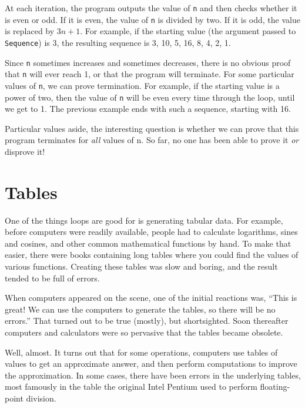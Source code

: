 At each iteration, the program outputs the value of {\tt n} and then
checks whether it is even or odd.  If it is even, the value of
{\tt n} is divided by two.  If it is odd, the value is replaced
by $3n+1$.  For example, if the starting value (the argument passed
to {\tt Sequence}) is 3, the resulting sequence is
3, 10, 5, 16, 8, 4, 2, 1.

Since {\tt n} sometimes increases and sometimes decreases, there is no
obvious proof that {\tt n} will ever reach 1, or that the program will
terminate.  For some particular values of {\tt n}, we can prove
termination.  For example, if the starting value is a power of two, then
the value of {\tt n} will be even every time through the loop, until
we get to 1.  The previous example ends with such a sequence,
starting with 16.

Particular values aside, the interesting question is whether
we can prove that this program terminates for {\em all} values of n.
So far, no one has been able to prove it {\em or} disprove it!

\section{Tables}

One of the things loops are good for is generating
tabular data.  For example, before computers were readily available,
people had to calculate logarithms, sines and cosines, and other
common mathematical functions by hand.
To make that easier, there were books containing long tables
where you could find the values of various functions.
Creating these tables was slow and boring, and the result
tended to be full of errors.

When computers appeared on the scene, one of the initial reactions
was, ``This is great!  We can use the computers to generate the
tables, so there will be no errors.''  That turned out to be true
(mostly), but shortsighted.  Soon thereafter computers and
calculators were so pervasive that the tables became obsolete.

Well, almost.  It turns out that for some operations, computers
use tables of values to get an approximate answer, and then
perform computations to improve the approximation.  In some
cases, there have been errors in the underlying tables, most
famously in the table the original Intel Pentium used to perform
floating-point division.


